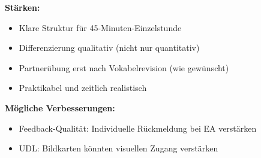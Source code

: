 \documentclass[11pt,a4paper]{article}
\begin{document}
\begin{scorebox}
\vspace{1em}
\textbf{Stärken:}
\begin{itemize}
    \item Klare Struktur für 45-Minuten-Einzelstunde
    \item Differenzierung qualitativ (nicht nur quantitativ)
    \item Partnerübung erst nach Vokabelrevision (wie gewünscht)
    \item Praktikabel und zeitlich realistisch
\end{itemize}

\textbf{Mögliche Verbesserungen:}
\begin{itemize}
    \item Feedback-Qualität: Individuelle Rückmeldung bei EA verstärken
    \item UDL: Bildkarten könnten visuellen Zugang verstärken
\end{itemize}
\end{scorebox}
\end{document}

